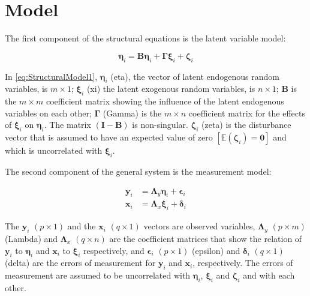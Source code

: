 \section{Model}

The first component of the structural equations is the latent variable model:


\begin{equation}
\bm{\eta}_{i}=\mathbf{B}\bm{\eta}_{i}+\bm{\Gamma}\bm{\xi}_{i}+\bm{\zeta}_{i}\label{eq:StructuralModel1}
\end{equation}

In \eqref{eq:StructuralModel1}, \(\bm{\eta}_{i}\) (eta), the vector
of latent endogenous random variables, is \(m\times1\); \(\bm{\xi}_{i}\)
(xi) the latent exogenous random variables, is \(n\times1\); \(\mathbf{B}\)
is the \(m\times m\) coefficient matrix showing the influence of the
latent endogenous variables on each other; \(\bm{\Gamma}\) (Gamma)
is the \(m\times n\) coefficient matrix for the effects of \(\bm{\xi}_{i}\)
on \(\bm{\eta}_{i}\). The matrix \(\left(\mathbf{I}-\mathbf{B}\right)\)
is non-singular. \(\bm{\zeta}_{i}\) (zeta) is the disturbance vector
that is assumed to have an expected value of zero \(\left[\mathbb{E}\left(\bm{\zeta}_{i}\right)=\mathbf{0}\right]\)
and which is uncorrelated with \(\bm{\xi}_{i}\).

The second component of the general system is the measurement model:


\begin{align}
\mathbf{y}_{i} & =\bm{\Lambda}_{y}\bm{\eta}_{i}+\bm{\epsilon}_{i}\label{eq:MeasurementModel1}\\
\mathbf{x}_{i} & =\bm{\Lambda}_{x}\bm{\xi}_{i}+\bm{\delta}_{i}\label{eq:MeasurementModel2}
\end{align}

The \(\mathbf{y}_{i}\) \(\left(p\times1\right)\) and the \(\mathbf{x}_{i}\)
\(\left(q\times1\right)\) vectors are observed variables, \(\bm{\Lambda}_{y}\)
\(\left(p\times m\right)\) (Lambda) and \(\bm{\Lambda}_{x}\) \(\left(q\times n\right)\)
are the coefficient matrices that show the relation of \(\mathbf{y}_{i}\)
to \(\bm{\eta}_{i}\) and \(\mathbf{x}_{i}\) to \(\bm{\xi}_{i}\) respectively,
and \(\bm{\epsilon}_{i}\) \(\left(p\times1\right)\) (epsilon) and \(\bm{\delta}_{i}\)
\(\left(q\times1\right)\) (delta) are the errors of measurement for
\(\mathbf{y}_{i}\) and \(\mathbf{x}_{i}\), respectively. The errors
of measurement are assumed to be uncorrelated with \(\bm{\eta}_{i}\),
\(\bm{\xi}_{i}\) and \(\bm{\zeta}_{i}\) and with each other.

